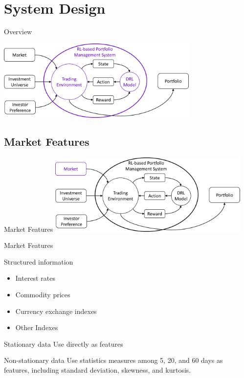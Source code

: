 \section{System Design}
\begin{frame}{Overview}
   \tableofcontents[sectionstyle=show/hide, hideothersubsections]
\begin{center}
  \includegraphics[width=10cm]{images/context_diagram.png}  
\end{center}
\end{frame}


\subsection{Market Features}
\begin{frame}{Market Features}
\centering
\includegraphics[width=10cm]{images/market.png}
\end{frame}

\begin{frame}{Market Features}
\begin{block}{Structured information}
\begin{itemize}
    \item Interest rates
    \item Commodity prices
    \item Currency exchange indexes
    \item Other Indexes
\end{itemize}
\end{block}
\begin{block}{Stationary data}
   Use directly as features
\end{block}
\begin{block}{Non-stationary data}
    Use statistics measures among 5, 20, and 60 days as features, including standard deviation, skewness, and kurtosis.
\end{block}
\end{frame}

